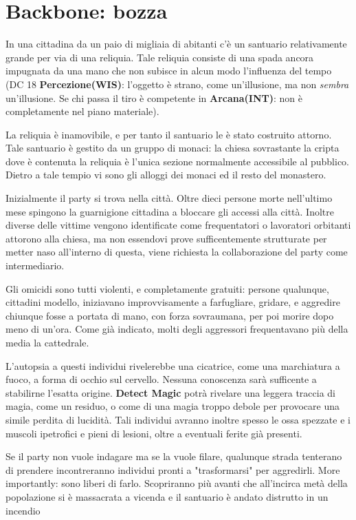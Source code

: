 \documentclass[10pt,twoside, twocolumn, openany]{dndbook}
\begin{document}
\section{Backbone: bozza}

In una cittadina da un paio di migliaia di abitanti c'è un santuario relativamente grande per via di una reliquia. Tale reliquia consiste di una spada ancora impugnata da una mano che non subisce in alcun modo l'influenza del tempo (DC 18 \textbf{Percezione(WIS)}: l'oggetto è strano, come un'illusione, ma non \textit{sembra} un'illusione. Se chi passa il tiro è competente in \textbf{Arcana(INT)}: non è completamente nel piano materiale).

La reliquia è inamovibile, e per tanto il santuario le è stato costruito attorno. Tale santuario è gestito da un gruppo di monaci: la chiesa sovrastante la cripta dove è contenuta la reliquia è l'unica sezione normalmente accessibile al pubblico. Dietro a tale tempio vi sono gli alloggi dei monaci ed il resto del monastero.

Inizialmente il party si trova nella città. Oltre dieci persone morte nell'ultimo mese spingono la guarnigione cittadina a bloccare gli accessi alla città. Inoltre diverse delle vittime vengono identificate come frequentatori o lavoratori orbitanti attorono alla chiesa, ma non essendovi prove sufficentemente strutturate per metter naso all'interno di questa, viene richiesta la collaborazione del party come intermediario.

Gli omicidi sono tutti violenti, e completamente gratuiti: persone qualunque, cittadini modello, iniziavano improvvisamente a farfugliare, gridare, e aggredire chiunque fosse a portata di mano, con forza sovraumana, per poi morire dopo meno di un'ora. Come già indicato, molti degli aggressori frequentavano più della media la cattedrale.

L'autopsia a questi individui rivelerebbe una cicatrice, come una marchiatura a fuoco, a forma di occhio sul cervello. Nessuna conoscenza sarà sufficente a stabilirne l'esatta origine. \textbf{Detect Magic} potrà rivelare una leggera traccia di magia, come un residuo, o come di una magia troppo debole per provocare una simile perdita di lucidità.
Tali individui avranno inoltre spesso le ossa spezzate e i muscoli ipetrofici e pieni di lesioni, oltre a eventuali ferite già presenti.

Se il party non vuole indagare ma se la vuole filare, qualunque strada tenterano di prendere incontreranno individui pronti a "trasformarsi" per aggredirli. More importantly: sono liberi di farlo. Scopriranno più avanti che all'incirca metà della popolazione si è massacrata a vicenda e il santuario è andato distrutto in un incendio
\end{document}
